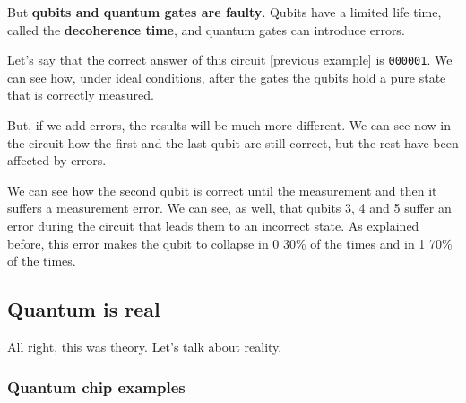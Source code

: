 \documentclass[11pt]{article}
\begin{document}
But \textbf{qubits and quantum gates are faulty}.
Qubits have a limited life time, called the \textbf{decoherence time}, and quantum gates can introduce errors.

Let's say that the correct answer of this circuit [previous example] is \texttt{000001}.
We can see how, under ideal conditions, after the gates the qubits hold a pure state that is correctly measured.

But, if we add errors, the results will be much more different.
We can see now in the circuit how the first and the last qubit are still correct, but the rest have been affected by errors.

\begin{figure}[H]
    \centering

\end{figure}

We can see how the second qubit is correct until the measurement and then it suffers a measurement error.
We can see, as well, that qubits 3, 4 and 5 suffer an error during the circuit that leads them to an incorrect state.
As explained before, this error makes the qubit to collapse in 0 30\% of the times and in 1 70\% of the times.

\subsection{Quantum is real}
\label{sec:org6aad16b}

All right, this was theory.
Let's talk about reality.

\subsubsection{Quantum chip examples}
\label{sec:orge9d45c8}
\end{document}
